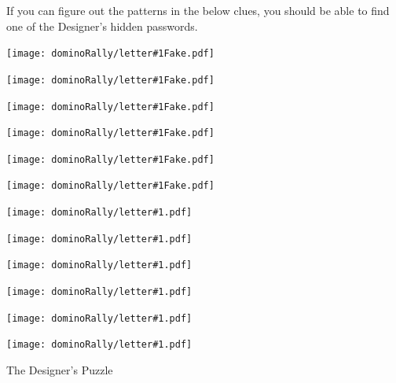 \documentclass{article}
\newcommand{\dominoLetter}[1]{
\texttt{[image: dominoRally/letter\#1.pdf]}
\hspace{0.03\linewidth}
}
\newcommand{\undominoLetter}[1]{
\texttt{[image: dominoRally/letter\#1Fake.pdf]}
\hspace{0.03\linewidth}
}
\begin{document}
If you can figure out the patterns in the below clues,
you should be able to find one of the Designer's
hidden passwords.

\begin{center}

\undominoLetter{V}%
\undominoLetter{O}%
\undominoLetter{W}%
\undominoLetter{E}%
\undominoLetter{L}%
\undominoLetter{S}%

\vspace{3em}

\dominoLetter{O}%
\dominoLetter{T}%
\dominoLetter{H}%
\dominoLetter{E}%
\dominoLetter{R}%
\dominoLetter{S}%

\end{center}


\newpage

The Designer's Puzzle
\end{document}
